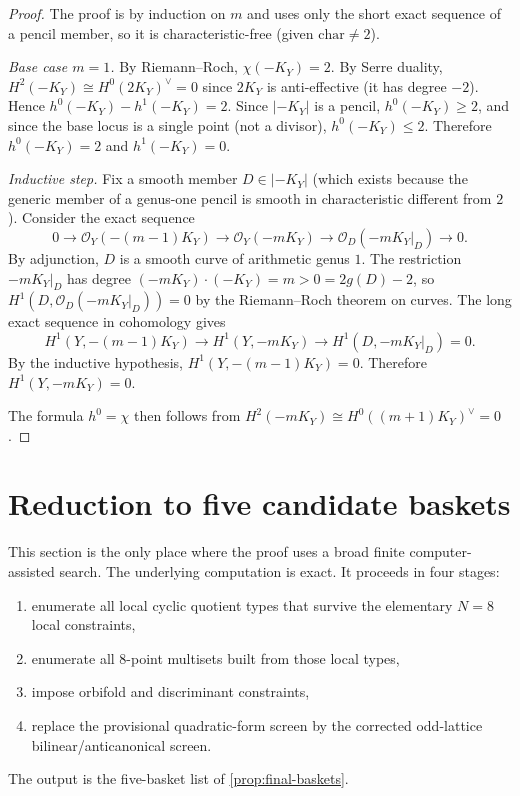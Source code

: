 \documentclass[11pt]{article}
\theoremstyle{definition}
\begin{document}
\begin{proof}
The proof is by induction on $m$ and uses only the short exact sequence of a pencil member, so it is characteristic-free (given $\mathrm{char}\ne 2$).

\medskip
\noindent
\textit{Base case $m=1$.}
By Riemann--Roch, $\chi(-K_Y)=2$. By Serre duality, $H^2(-K_Y)\cong H^0(2K_Y)^{\vee}=0$ since $2K_Y$ is anti-effective (it has degree $-2$). Hence $h^0(-K_Y)-h^1(-K_Y)=2$. Since $|-K_Y|$ is a pencil, $h^0(-K_Y)\ge 2$, and since the base locus is a single point (not a divisor), $h^0(-K_Y)\le 2$. Therefore $h^0(-K_Y)=2$ and $h^1(-K_Y)=0$.

\medskip
\noindent
\textit{Inductive step.}
Fix a smooth member $D\in |-K_Y|$ (which exists because the generic member of a genus-one pencil is smooth in characteristic different from $2$). Consider the exact sequence
\[
0\to \mathcal O_Y(-(m-1)K_Y)\to \mathcal O_Y(-mK_Y)\to \mathcal O_D(-mK_Y|_D)\to 0.
\]
By adjunction, $D$ is a smooth curve of arithmetic genus $1$. The restriction $-mK_Y|_D$ has degree $(-mK_Y)\cdot(-K_Y)=m>0=2g(D)-2$, so $H^1(D,\mathcal O_D(-mK_Y|_D))=0$ by the Riemann--Roch theorem on curves. The long exact sequence in cohomology gives
\[
H^1(Y,-{(m-1)}K_Y)\to H^1(Y,-mK_Y)\to H^1(D,-mK_Y|_D)=0.
\]
By the inductive hypothesis, $H^1(Y,-(m-1)K_Y)=0$. Therefore $H^1(Y,-mK_Y)=0$.

The formula $h^0=\chi$ then follows from $H^2(-mK_Y)\cong H^0((m+1)K_Y)^{\vee}=0$.
\end{proof}

\section{Reduction to five candidate baskets}\label{sec:baskets}

This section is the only place where the proof uses a broad finite computer-assisted search. The underlying computation is exact. It proceeds in four stages:
\begin{enumerate}[label=\textup{(\arabic*)}]
\item enumerate all local cyclic quotient types that survive the elementary $N=8$ local constraints,
\item enumerate all $8$-point multisets built from those local types,
\item impose orbifold and discriminant constraints,
\item replace the provisional quadratic-form screen by the corrected odd-lattice bilinear/anticanonical screen.
\end{enumerate}
The output is the five-basket list of \cref{prop:final-baskets}.
\end{document}

